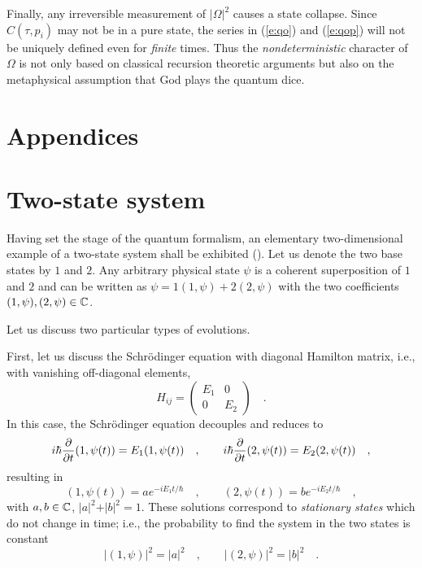 Finally,
any irreversible measurement of $\vert \Omega \vert^2$
causes a state collapse.
Since $ C(\tau ,p_i) $ may not be in a
pure state, the  series in
 (\ref{e:qo}) and
 (\ref{e:qop})
will not be uniquely defined even for {\em finite} times.
Thus the {\em nondeterministic} character of $\Omega$ is not only based
on classical recursion theoretic arguments \cite{chaitin2,chaitin3} but
also on the metaphysical assumption that  God plays the
quantum dice.



\appendix
\section*{Appendices}
\section{Two-state system}
\label{tws}

Having set the stage of the quantum formalism, an
elementary two-dimensional example of a two-state system shall be
exhibited
(\cite[pp. 8-11]{feynman-III}). Let us denote the two base
states by
$ 1 $ and $
2$.
Any arbitrary physical state $ \psi $ is a coherent
superposition of
$ 1 $ and $
2$
and can be written as
$ \psi  =
 1 ( 1, \psi ) +
2 ( 2, \psi )$ with the two coefficients
$( 1, \psi ) ,
( 2, \psi ) \in {\Bbb C}$.

Let us discuss two particular types of evolutions.

First, let us discuss the Schr\"odinger equation with
diagonal Hamilton matrix, i.e., with vanishing off-diagonal elements,
\begin{equation}
 H_{ij} =\left( \begin{array}{cc} E_1  & 0\\
0 &E_2
 \end{array} \right)
 \quad .
\end{equation}
In this case, the Schr\"odinger equation decouples and
reduces to
\begin{equation}
i\hbar {\partial \over \partial t} ( 1 , \psi (t) )   =
E_1 ( 1 , \psi (t) )
\quad ,\qquad
i\hbar {\partial \over \partial t} ( 2 , \psi  (t) )   =
E_2 ( 2 , \psi (t) )
\quad ,
\end{equation}
resulting in
\begin{equation}
( 1 , \psi (t) )   = a e^{-iE_1t/\hbar}
\quad ,\qquad
( 2 , \psi (t) )   = b e^{-iE_2t/\hbar}
\quad ,
\end{equation}
with $a,b\in {\Bbb C}$, $\vert a\vert ^2+\vert b\vert ^2=1$.
These solutions
correspond to {\em stationary states} which do not change in time; i.e.,
the probability to find the system in the two states is constant
\begin{equation}
\vert ( 1 , \psi  )  \vert^2 = \vert a\vert ^2
\quad ,\qquad
\vert ( 2 , \psi  )   \vert^2 = \vert b\vert^2
\quad .
\end{equation}


